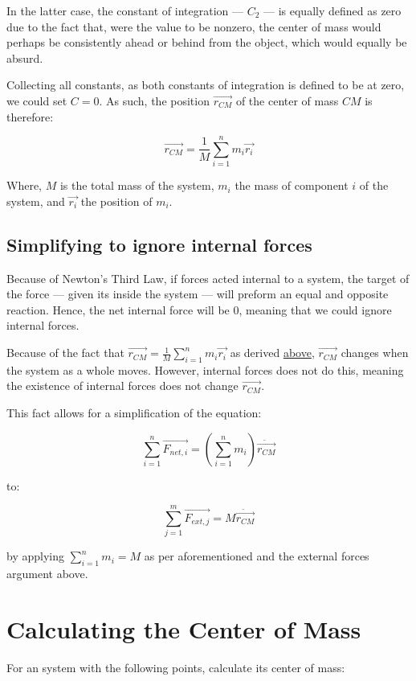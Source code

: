 \documentclass[letterpaper]{article}
\begin{document}
In the latter case, the constant of integration --- \(C_2\) --- is equally defined as zero due to the fact that, were the value to be nonzero, the center of mass would perhaps be consistently ahead or behind from the object, which would equally be absurd.

Collecting all constants, as both constants of integration is defined to be at zero, we could set \(C=0\). As such, the position \(\vec{r_{CM}}\) of the center of mass \(CM\) is therefore:

\begin{equation}
\vec{r_{CM}} = \frac{1}{M} \sum^n_{i=1} m_i \vec{r_i}
\end{equation}

Where, \(M\) is the total mass of the system, \(m_i\) the mass of component \(i\) of the system, and \(\vec{r_i}\) the position of \(m_i\).

\subsection{Simplifying to ignore internal forces}
\label{sec:org79babe6}
Because of Newton's Third Law, if forces acted internal to a system, the target of the force --- given its inside the system --- will preform an equal and opposite reaction. Hence, the net internal force will be \(0\), meaning that we could ignore internal forces.

Because of the fact that \(\vec{r_{CM}} = \frac{1}{M} \sum^n_{i=1} m_i \vec{r_i}\) as derived \hyperref[sec:org8b1f90c]{above}, \(\vec{r_{CM}}\) changes when the system as a whole moves. However, internal forces does not do this, meaning the existence of internal forces does not change \(\vec{r_{CM}}\).

This fact allows for a simplification of the equation:

\begin{equation}
\sum^n_{i=1} \vec{F_{net,i}} = (\sum^n_{i=1} m_i) \ddot{\vec{r_{CM}}}
\end{equation}

to:

\begin{equation}
\sum^m_{j=1} \vec{F_{ext,j}} = M \ddot{\vec{r_{CM}}}
\end{equation}

by applying  \(\sum^n_{i=1} m_i = M\) as per aforementioned and the external forces argument above.

\section{Calculating the Center of Mass}
\label{sec:org4447865}
For an system with the following points, calculate its center of mass:
\end{document}
